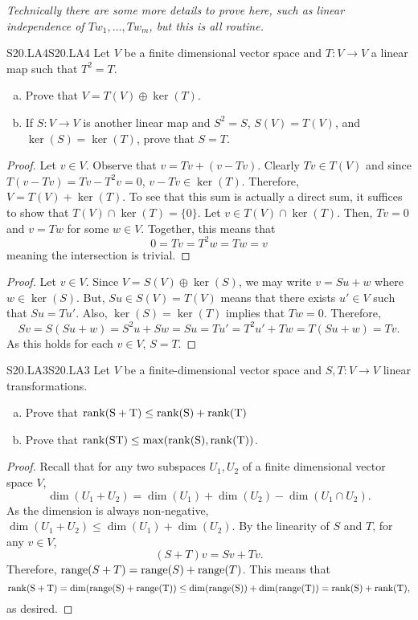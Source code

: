 \documentclass[../../AlgebraQualSolutions.tex]{subfiles}
\begin{document}
	\emph{Technically there are some more details to prove here, such as linear independence of $Tw_1,\ldots, Tw_m$, but this is all routine.}

	\begin{prob}{S20.LA4}{S20.LA4}
		Let $V$ be a finite dimensional vector space and $T: V \to V$ a linear map such that $T^2 = T$.
		\begin{enumerate}[(a)]
			\item Prove that $V = T(V) \oplus \ker(T)$.
			\item If $S: V \to V$ is another linear map and $S^2 = S$, $S(V) = T(V)$, and $\ker(S) = \ker(T)$, prove that $S = T$.
		\end{enumerate}
	\end{prob}

	\begin{proof}
		Let $v \in V$. Observe that $v = Tv + (v - Tv)$. Clearly $Tv \in T(V)$ and since $T(v - Tv) = Tv - T^2v = 0$, $v - Tv \in \ker(T)$. Therefore, $V = T(V) + \ker(T)$. To see that this sum is actually a direct sum, it suffices to show that $T(V) \cap \ker(T) = \{0\}$. Let $v \in T(V) \cap \ker(T)$. Then, $Tv = 0$ and $v = Tw$ for some $w \in V$. Together, this means that
			\[0 = Tv = T^2w = Tw = v\]
		meaning the intersection is trivial.
	\end{proof}

	\begin{proof}
		Let $v \in V$. Since $V = S(V) \oplus \ker(S)$, we may write $v = Su + w$ where $w \in \ker(S)$. But, $Su \in S(V) = T(V)$ means that there exists $u' \in V$ such that $Su = Tu'$. Also, $\ker(S) = \ker(T)$ implies that $Tw = 0$. Therefore,
			\[Sv = S(Su + w) = S^2u + Sw = Su = Tu' = T^2u' + Tw = T(Su + w) = Tv.\]
		As this holds for each $v \in V$, $S = T$.
	\end{proof}

	\begin{prob}{S20.LA3}{S20.LA3}
		Let $V$ be a finite-dimensional vector space and $S,T: V \to V$ linear transformations.
		\begin{enumerate}[(a)]
			\item Prove that $\rm{rank}(S+T) \leq \rm{rank}(S) + \rm{rank}(T)$
			\item Prove that $\rm{rank}(ST) \leq \max(\rm{rank}(S), \rm{rank}(T))$.
		\end{enumerate}
	\end{prob}

	\begin{proof}
		Recall that for any two subspaces $U_1,U_2$ of a finite dimensional vector space $V$,
			\[\dim(U_1 + U_2) = \dim(U_1) + \dim(U_2) - \dim(U_1 \cap U_2).\]
		As the dimension is always non-negative, $\dim(U_1 + U_2) \leq \dim(U_1) + \dim(U_2)$. By the linearity of $S$ and $T$, for any $v \in V$,
			\[(S + T)v = Sv + Tv.\]
		Therefore, $\mathrm{range}(S + T) = \mathrm{range}(S) + \mathrm{range}(T)$. This means that
			\[\rm{rank}(S+T) = \dim(\mathrm{range}(S) + \mathrm{range}(T)) \leq \dim(\mathrm{range}(S)) + \dim(\mathrm{range}(T)) = \rm{rank}(S) + \rm{rank}(T),\]
		as desired.
	\end{proof}
\end{document}
